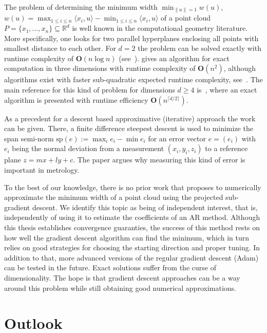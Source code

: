 The problem of determining the minimum width $\min_{\|u\|=1}w(u)$, $w(u)=\max_{1\le i\le n}\langle x_i,u\rangle-\min_{1\le i\le n}\langle x_i,u\rangle$ of a point cloud $P=\{x_1,\dots,x_n\}\subseteq\mathbb{R}^{d}$ is well known in the computational geometry literature. More specifically, one looks for two parallel hyperplanes enclosing all points with smallest distance to each other. For $d=2$ the problem can be solved exactly with runtime complexity of $\mathbf{O}(n\log{n})$ (see~\cite[]{atallah_computational_1986}). \cite{10.1145/323233.323234} gives an algorithm for exact computation in three dimensions with runtime complexity of $\mathbf{O}(n^2)$, although algorithms exist with faster sub-quadratic expected runtime complexity, see~\cite[Corollary~3.6]{agarwal_efficient_nodate}. The main reference for this kind of problem for dimensions $d\ge4$ is~\cite{doi:10.1142/S0218195902000748}, where an exact algorithm is presented with runtime efficiency $\mathbf{O}(n^{\lceil d/2\rceil})$.

As a precedent for a descent based approximative (iterative) approach the work~\cite{gosavi_finite-differences_2006} can be given. There, a finite difference steepest descent is used to minimize the span semi-norm $\text{sp}(e):=\max_ie_i-\min e_i$ for an error vector $e=(e_i)$ with $e_i$ being the normal deviation from a measurement $(x_i,y_i,z_i)$ to a reference plane $z=mx+ly+c$. The paper argues why measuring this kind of error is important in metrology.

To the best of our knowledge, there is no prior work that proposes to numerically approximate the minimum width of a point cloud using the projected sub-gradient descent. We identify this topic as being of independent interest, that is, independently of using it to estimate the coefficients of an AR method. Although this thesis establishes convergence guaranties, the success of this method rests on how well the gradient descent algorithm can find the minimum, which in turn relies on good strategies for choosing the starting direction and proper tuning. In addition to that, more advanced versions of the regular gradient descent (Adam) can be tested in the future. Exact solutions suffer from the curse of dimensionality. The hope is that gradient descent approaches can be a way around this problem while still obtaining good numerical approximations.


\section{Outlook}


